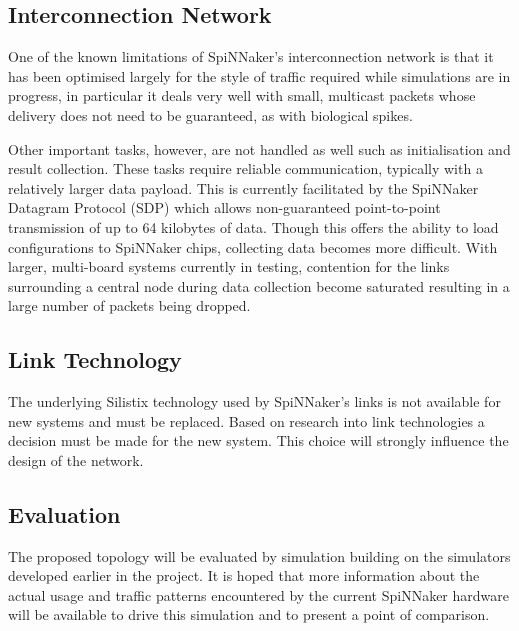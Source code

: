 		\subsection{Interconnection Network}
			
			One of the known limitations of SpiNNaker's interconnection network is
			that it has been optimised largely for the style of traffic required while
			simulations are in progress, in particular it deals very well with small,
			multicast packets whose delivery does not need to be guaranteed, as with
			biological spikes.
			
			Other important tasks, however, are not handled as well such as
			initialisation and result collection. These tasks require reliable
			communication, typically with a relatively larger data payload. This is
			currently facilitated by the SpiNNaker Datagram Protocol (SDP)
			\cite{temple11} which allows non-guaranteed point-to-point transmission of
			up to 64 kilobytes of data. Though this offers the ability to load
			configurations to SpiNNaker chips, collecting data becomes more difficult.
			With larger, multi-board systems currently in testing, contention for the
			links surrounding a central node during data collection become saturated
			resulting in a large number of packets being dropped.
		
		\subsection{Link Technology}
			
			The underlying Silistix technology used by SpiNNaker's links is not
			available for new systems and must be replaced. Based on research into
			link technologies a decision must be made for the new system. This choice
			will strongly influence the design of the network.
		
		
		\subsection{Evaluation}
			
			The proposed topology will be evaluated by simulation building on the
			simulators developed earlier in the project. It is hoped that more
			information about the actual usage and traffic patterns encountered by the
			current SpiNNaker hardware will be available to drive this simulation and
			to present a point of comparison.
		
